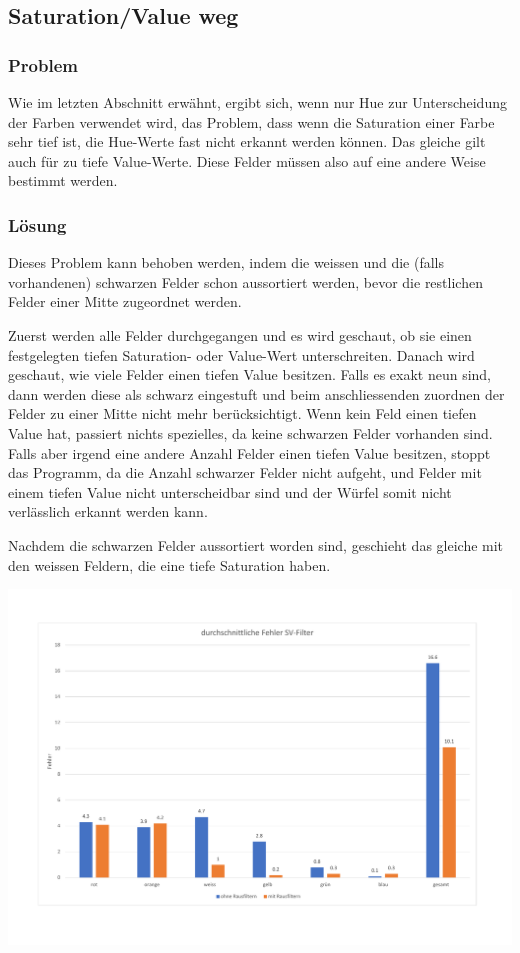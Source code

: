 \documentclass[a4paper, 12pt]{article}
\begin{document}
\subsection{Saturation/Value weg}
\subsubsection{Problem}
Wie im letzten Abschnitt erwähnt, ergibt sich, wenn nur Hue zur Unterscheidung der Farben verwendet wird, das Problem, dass wenn die Saturation einer Farbe sehr tief ist, die Hue-Werte fast nicht erkannt werden können. Das gleiche gilt auch für zu tiefe Value-Werte. Diese Felder müssen also auf eine andere Weise bestimmt werden. 
\subsubsection{Lösung}
Dieses Problem kann behoben werden, indem die weissen und die (falls vorhandenen) schwarzen Felder schon aussortiert werden, bevor die restlichen Felder einer Mitte zugeordnet werden.

Zuerst werden alle Felder durchgegangen und es wird geschaut, ob sie einen festgelegten tiefen Saturation- oder Value-Wert unterschreiten. Danach wird geschaut, wie viele Felder einen tiefen Value besitzen. Falls es exakt neun sind, dann werden diese als schwarz eingestuft und beim anschliessenden zuordnen der Felder zu einer Mitte nicht mehr berücksichtigt. Wenn kein Feld einen tiefen Value hat, passiert nichts spezielles, da keine schwarzen Felder vorhanden sind. Falls aber irgend eine andere Anzahl Felder einen tiefen Value besitzen, stoppt das Programm, da die Anzahl schwarzer Felder nicht aufgeht, und Felder mit einem tiefen Value nicht unterscheidbar sind und der Würfel somit nicht verlässlich erkannt werden kann.

 Nachdem die schwarzen Felder aussortiert worden sind, geschieht das gleiche mit den weissen Feldern, die eine tiefe Saturation haben. 
 
\includegraphics[scale=0.4]{Fehler_SV_Filter} 
 
\end{document}
